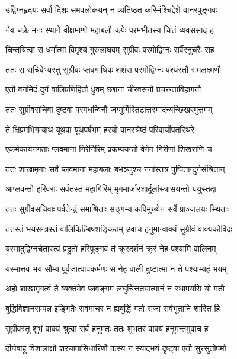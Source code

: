 \twolineshloka
{उद्विग्नहृदयः सर्वा दिशः समवलोकयन्}
{न व्यतिष्ठत कस्मिंश्चिद्देशे वानरपुङ्गवः} %

\twolineshloka
{नैव चक्रे मनः स्थाने वीक्षमाणो महाबलौ}
{कपेः परमभीतस्य चित्तं व्यवससाद ह} %

\twolineshloka
{चिन्तयित्वा स धर्मात्मा विमृश्य गुरुलाघवम्}
{सुग्रीवः परमोद्विग्नः सर्वैरनुचरैः सह} %

\twolineshloka
{ततः स सचिवेभ्यस्तु सुग्रीवः प्लवगाधिपः}
{शशंस परमोद्विग्नः पश्यंस्तौ रामलक्ष्मणौ} %

\twolineshloka
{एतौ वनमिदं दुर्गं वालिप्रणिहितौ ध्रुवम्}
{छद्मना चीरवसनौ प्रचरन्ताविहागतौ} %

\twolineshloka
{ततः सुग्रीवसचिवा दृष्ट्वा परमधन्विनौ}
{जग्मुर्गिरितटात्तस्मादन्यच्छिखरमुत्तमम्} %

\twolineshloka
{ते क्षिप्रमभिगम्याथ यूथपा यूथपर्षभम्}
{हरयो वानरश्रेष्ठं परिवार्योपतस्थिरे} %

\twolineshloka
{एकमेकायनगताः प्लवमाना गिरेर्गिरिम्}
{प्रकम्पयन्तो वेगेन गिरीणां शिखराणि च} %

\twolineshloka
{ततः शाखामृगाः सर्वे प्लवमाना महाबलाः}
{बभञ्जुश्च नगांस्तत्र पुष्पितान्दुर्गसंश्रितान्} %

\twolineshloka
{आप्लवन्तो हरिवराः सर्वतस्तं महागिरिम्}
{मृगमार्जारशार्दूलांस्त्रासयन्तो ययुस्तदा} %

\twolineshloka
{ततः सुग्रीवसचिवाः पर्वतेन्द्रं समाश्रिताः}
{सङ्गम्य कपिमुख्येन सर्वे प्राञ्जलयः स्थिताः} %

\twolineshloka
{ततस्तं भयसन्त्रस्तं वालिकिल्बिषशङ्कितम्}
{उवाच हनुमान्वाक्यं सुग्रीवं वाक्यकोविदः} %

\twolineshloka
{यस्मादुद्विग्नचेतास्त्वं प्रद्रुतो हरिपुङ्गव}
{तं क्रूरदर्शनं क्रूरं नेह पश्यामि वालिनम्} %

\twolineshloka
{यस्मात्तव भयं सौम्य पूर्वजात्पापकर्मणः}
{स नेह वाली दुष्टात्मा न ते पश्याम्यहं भयम्} %

\twolineshloka
{अहो शाखामृगत्वं ते व्यक्तमेव प्लवङ्गम}
{लघुचित्ततयात्मानं न स्थापयसि यो मतौ} %

\twolineshloka
{बुद्धिविज्ञानसम्पन्न इङ्गितैः सर्वमाचर}
{न ह्यबुद्धिं गतो राजा सर्वभूतानि शास्ति हि} %

\twolineshloka
{सुग्रीवस्तु शुभं वाक्यं श्रुत्वा सर्वं हनूमतः}
{ततः शुभतरं वाक्यं हनूमन्तमुवाच ह} %

\twolineshloka
{दीर्घबाहू विशालाक्षौ शरचापासिधारिणौ}
{कस्य न स्याद्भयं दृष्ट्वा एतौ सुरसुतोपमौ} %


